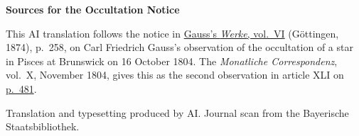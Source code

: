 \clearpage\thispagestyle{empty}
\begin{center}\textbf{Sources for the Occultation Notice}\end{center}
\noindent This AI translation follows the notice in \href{https://gdz.sub.uni-goettingen.de/id/PPN236007467}{Gauss’s \textit{Werke}, vol.~VI} (Göttingen, 1874), p.~258, on Carl Friedrich Gauss’s observation of the occultation of a star in Pisces at Brunswick on 16 October 1804. The \textit{Monatliche Correspondenz}, vol.~X, November 1804, gives this as the second observation in article XLI on \href{https://www.digitale-sammlungen.de/en/view/bsb10538602?page=495}{p.~481}.
\par\smallskip\noindent Translation and typesetting produced by AI. Journal scan from the Bayerische Staatsbibliothek.
\clearpage
